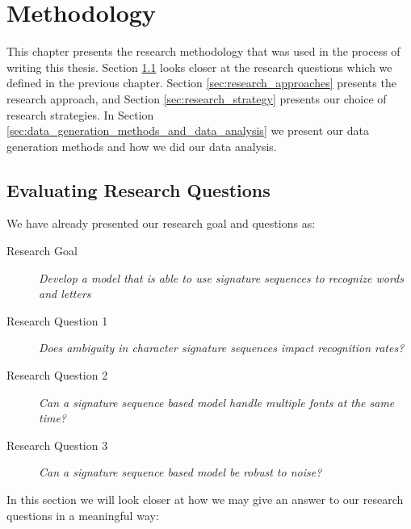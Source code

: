 
\chapter{Methodology}
\label{ch:methodology}
This chapter presents the research methodology that was used in the process of writing this thesis. Section \ref{sec:research_questions_and_approach} looks closer at the research questions which we defined in the previous chapter. Section \ref{sec:research_approaches} presents the research approach, and Section \ref{sec:research_strategy} presents our choice of research strategies. In Section \ref{sec:data_generation_methods_and_data_analysis} we present our data generation methods and how we did our data analysis.


\section{Evaluating Research Questions}
\label{sec:research_questions_and_approach}
We have already presented our research goal and questions as:

\begin{description}
    \item[Research Goal]{\textit{Develop a model that is able to use signature sequences to recognize words and letters}}
    \item[Research Question 1]{\textit{Does ambiguity in character signature sequences impact recognition rates?}}
    \item[Research Question 2]{\textit{Can a signature sequence based model handle multiple fonts at the same time?}}
    \item[Research Question 3]{\textit{Can a signature sequence based model be robust to noise?}}
\end{description}

In this section we will look closer at how we may give an answer to our research questions in a meaningful way:

